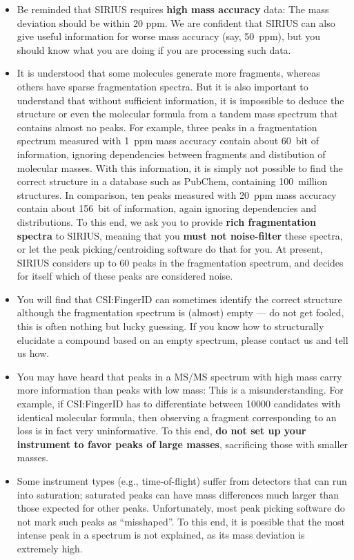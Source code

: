 \documentclass[letterpaper,10pt,openany,oneside]{sphinxmanual}
\begin{document}
\begin{itemize}
\item Be reminded that SIRIUS requires \textbf{high mass accuracy} data:
  The mass deviation should be within 20 ppm.  We are confident that
  SIRIUS can also give useful information for worse mass accuracy (say,
  50~ppm), but you should know what you are doing if you are processing such
  data.

\item It is understood that some molecules generate more fragments, whereas
  others have sparse fragmentation spectra.  But it is also important to
  understand that without sufficient information, it is impossible to deduce
  the structure or even the molecular formula from a tandem mass spectrum
  that contains almost no peaks.  For example, three peaks in a fragmentation
  spectrum measured with 1~ppm mass accuracy contain about 60~bit of
  information, ignoring dependencies between fragments and distibution of
  molecular masses.  With this information, it is simply not possible to find
  the correct structure in a database such as PubChem, containing 100~million
  structures.  In comparison, ten peaks measured with 20~ppm mass accuracy
  contain about 156~bit of information, again ignoring dependencies and
  distributions.  To this end, we ask you to provide \textbf{rich
  fragmentation spectra} to SIRIUS, meaning that you \textbf{must not
  noise-filter} these spectra, or let the peak picking/centroiding software
  do that for you.  At present, SIRIUS considers up to 60 peaks in the
  fragmentation spectrum, and decides for itself which of these peaks are
  considered noise.

\item You will find that CSI:FingerID can sometimes identify the correct
  structure although the fragmentation spectrum is (almost) empty --- do not
  get fooled, this is often nothing but lucky guessing.  If you know how to
  structurally elucidate a compound based on an empty spectrum, please
  contact us and tell us how.

\item You may have heard that peaks in a MS/MS spectrum with high mass
  carry more information than peaks with low mass: This is a
  misunderstanding.  For example, if CSI:FingerID has to differentiate
  between 10000 candidates with identical molecular formula, then observing a
  fragment corresponding to an  loss is in fact very uninformative.
  To this end, \textbf{do not set up your instrument to favor peaks of large
  masses}, sacrificing those with smaller masses.

\item Some instrument types (e.g., time-of-flight) suffer from detectors that
  can run into saturation; saturated peaks can have mass differences much
  larger than those expected for other peaks.  Unfortunately, most peak
  picking software do not mark such peaks as ``misshaped''.  To this end, it
  is possible that the most intense peak in a spectrum is not explained, as
  its mass deviation is extremely high.
\end{itemize}
\end{document}
